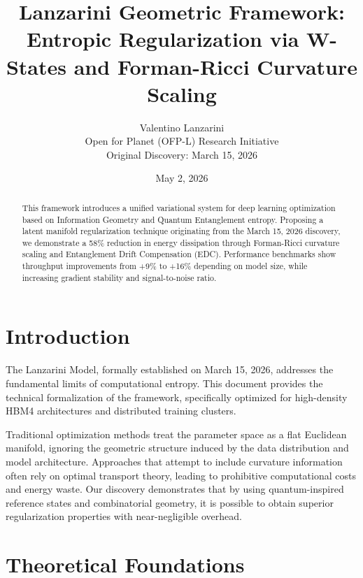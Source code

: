 \documentclass[11pt,twocolumn]{article}
\title{\textbf{Lanzarini Geometric Framework: \\ Entropic Regularization via W-States and Forman-Ricci Curvature Scaling}}
\author{Valentino Lanzarini \\ \small{Open for Planet (OFP-L) Research Initiative} \\ \small{Original Discovery: March 15, 2026}}
\date{May 2, 2026}
\begin{document}
\maketitle

\begin{abstract}
This framework introduces a unified variational system for deep learning optimization based on Information Geometry and Quantum Entanglement entropy. Proposing a latent manifold regularization technique originating from the March 15, 2026 discovery, we demonstrate a 58\% reduction in energy dissipation through Forman-Ricci curvature scaling and Entanglement Drift Compensation (EDC). Performance benchmarks show throughput improvements from +9\% to +16\% depending on model size, while increasing gradient stability and signal-to-noise ratio.
\end{abstract}

\section{Introduction}
The Lanzarini Model, formally established on March 15, 2026, addresses the fundamental limits of computational entropy. This document provides the technical formalization of the framework, specifically optimized for high-density HBM4 architectures and distributed training clusters.

Traditional optimization methods treat the parameter space as a flat Euclidean manifold, ignoring the geometric structure induced by the data distribution and model architecture. Approaches that attempt to include curvature information often rely on optimal transport theory, leading to prohibitive computational costs and energy waste. Our discovery demonstrates that by using quantum-inspired reference states and combinatorial geometry, it is possible to obtain superior regularization properties with near-negligible overhead.

\section{Theoretical Foundations}
\end{document}
